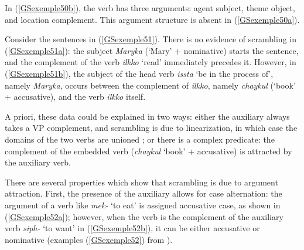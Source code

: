 {In (\ref{GSexemple50b}), the verb has three arguments: agent subject, theme object, and location complement. This argument structure is absent in (\ref{GSexemple50a}).

Consider the sentences in (\ref{GSexemple51}). There is no evidence of scrambling in (\ref{GSexemple51a}): the subject \emph{Maryka} (`Mary' + nominative) starts the sentence, and the complement of the verb \emph{ilkko} `read' immediately precedes it. However, in (\ref{GSexemple51b}), the subject of the head verb \emph{issta} `be in the process of', namely \emph{Maryka}, occurs between the complement of \emph{ilkko}, namely \emph{chaykul} (`book' + accusative), and the verb \emph{ilkko} itself.
\eal
	\label{GSexemple51}
	\label{GSexemple51a}
		
	\label{GSexemple51b}

\zl

A priori, these data could be explained in two ways: either the auxiliary always takes a VP complement, and scrambling is due to linearization, in which case the domains of the two verbs are unioned \citep{Reape94a}; or there is a complex predicate: the complement of the embedded verb (\emph{chaykul} `book' + accusative) is attracted by the auxiliary verb. 

There are several properties which show that scrambling is due to argument attraction. First, the presence of the auxiliary allows for case alternation: the argument of a verb like \emph{mek-} `to eat' is assigned accusative case, as shown in (\ref{GSexemple52a}); however, when the verb is the complement of the auxiliary verb \emph{siph-} `to want' in (\ref{GSexemple52b}), it can be either accusative or nominative (examples (\ref{GSexemple52}) from \citealt[87]{Kim2016a-u}).

\eal
	\label{GSexemple52}
	\label{GSexemple52a}
		
}
